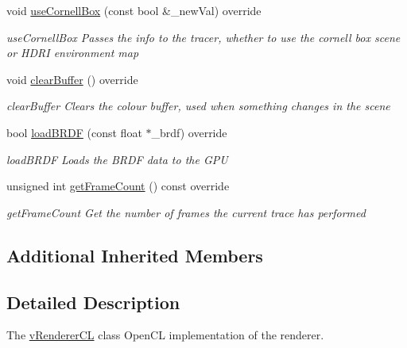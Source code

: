 \begin{DoxyCompactItemize}
void \hyperlink{classvRendererCL_ae9991460d59a4a86cc19c436a98cd346}{use\-Cornell\-Box} (const bool \&\-\_\-new\-Val) override
\begin{DoxyCompactList}\small\item\em use\-Cornell\-Box Passes the info to the tracer, whether to use the cornell box scene or H\-D\-R\-I environment map \end{DoxyCompactList}\item 
\hypertarget{classvRendererCL_aeee2cef9e03af6095ea0b8237d2ab184}{void \hyperlink{classvRendererCL_aeee2cef9e03af6095ea0b8237d2ab184}{clear\-Buffer} () override}\label{classvRendererCL_aeee2cef9e03af6095ea0b8237d2ab184}

\begin{DoxyCompactList}\small\item\em clear\-Buffer Clears the colour buffer, used when something changes in the scene \end{DoxyCompactList}\item 
bool \hyperlink{classvRendererCL_a80988c343d250965cc184695fafc7a10}{load\-B\-R\-D\-F} (const float $\ast$\-\_\-brdf) override
\begin{DoxyCompactList}\small\item\em load\-B\-R\-D\-F Loads the B\-R\-D\-F data to the G\-P\-U \end{DoxyCompactList}\item 
unsigned int \hyperlink{classvRendererCL_a30e02c917778a288dd83a7a29882d030}{get\-Frame\-Count} () const override
\begin{DoxyCompactList}\small\item\em get\-Frame\-Count Get the number of frames the current trace has performed \end{DoxyCompactList}\end{DoxyCompactItemize}
\subsection*{Additional Inherited Members}


\subsection{Detailed Description}
The \hyperlink{classvRendererCL}{v\-Renderer\-C\-L} class Open\-C\-L implementation of the renderer. 

